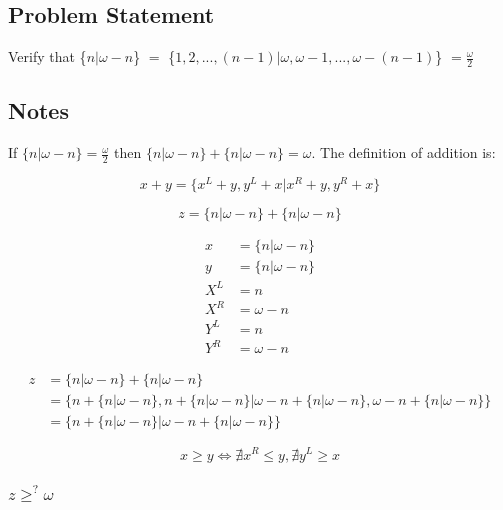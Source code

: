 \subsection*{Problem Statement}
\def \surr[#1][#2]{\{#1$|$#2\}}

Verify that \surr[$n$][$\omega - n$]
$=$
\surr[$1,2,...,(n - 1)$][$\omega, \omega - 1, ..., \omega - (n - 1)$]
$= \frac{\omega}{2}$

\subsection*{Notes}
If $\{n|\omega - n\}=\frac{\omega}{2}$ then $\{n|\omega - n\} + \{n|\omega - n\}=\omega$.  The definition of addition is:

\begin{equation*}
    x + y = \{x^L + y, y^L + x | x^R + y, y^R + x\}
\end{equation*}

\begin{equation*}
    z = \{n|\omega - n\} + \{n|\omega - n\}
\end{equation*}

\begin{align*}
    x &= \{n|\omega - n\} \\
    y &= \{n|\omega - n\} \\
    X^L &= n \\
    X^R &= \omega - n \\
    Y^L &= n \\
    Y^R &= \omega - n
\end{align*}

\begin{align*}
    z &= \{n|\omega - n\} + \{n|\omega - n\} \\
    &= \{n + \{n|\omega - n\}, n + \{n|\omega - n\} | \omega - n + \{n|\omega - n\}, \omega - n + \{n|\omega - n\}\} \\
    &= \{n + \{n|\omega - n\} | \omega - n + \{n|\omega - n\}\}
\end{align*}

\begin{equation*}
    x \geqslant y \Leftrightarrow \nexists x^R \leq y, \nexists y^L \geq x
\end{equation*}

\subsubsection*{$z \ge^? \omega$}

\surrealgeqexplain

